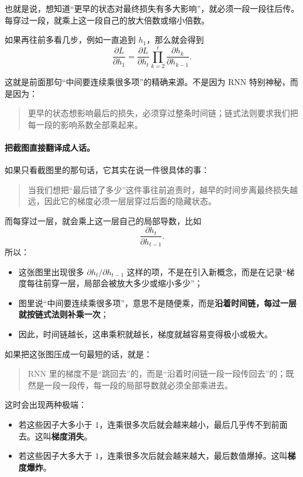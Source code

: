 \documentclass[12pt,a4paper]{ctexart}
\begin{document}
也就是说，想知道“更早的状态对最终损失有多大影响”，就必须一段一段往后传。每穿过一段，就乘上这一段自己的放大倍数或缩小倍数。

如果再往前多看几步，例如一直追到 \(h_1\)，那么就会得到
\[
\frac{\partial L}{\partial h_1}
=
\frac{\partial L}{\partial h_t}
\prod_{k=2}^{t}
\frac{\partial h_k}{\partial h_{k-1}}.
\]

这就是前面那句“中间要连续乘很多项”的精确来源。不是因为 RNN 特别神秘，而是因为：
\begin{quote}
更早的状态想影响最后的损失，必须穿过整条时间链；链式法则要求我们把每一段的影响系数全部乘起来。
\end{quote}

\paragraph{把截图直接翻译成人话。}
如果只看截图里的那句话，它其实在说一件很具体的事：
\begin{quote}
当我们想把“最后错了多少”这件事往前追责时，越早的时间步离最终损失越远，因此它的梯度必须一层层穿过后面的隐藏状态。
\end{quote}

而每穿过一层，就会乘上这一层自己的局部导数，比如
\[
\frac{\partial h_t}{\partial h_{t-1}}.
\]
所以：
\begin{itemize}
  \item 这张图里出现很多 \(\partial h_t / \partial h_{t-1}\) 这样的项，不是在引入新概念，而是在记录“梯度每往前穿一层，局部会被放大多少或缩小多少”；
  \item 图里说“中间要连续乘很多项”，意思不是随便乘，而是\textbf{沿着时间链，每过一层就按链式法则补乘一次}；
  \item 因此，时间链越长，这串乘积就越长，梯度就越容易变得极小或极大。
\end{itemize}

如果把这张图压成一句最短的话，就是：
\begin{quote}
RNN 里的梯度不是“跳回去”的，而是“沿着时间链一段一段传回去”的；既然是一段一段传，每一段的局部导数就必须全部乘进去。
\end{quote}

这时会出现两种极端：
\begin{itemize}
  \item 若这些因子大多小于 \(1\)，连乘很多次后就会越来越小，最后几乎传不到前面去。这叫\textbf{梯度消失}。
  \item 若这些因子大多大于 \(1\)，连乘很多次后就会越来越大，最后数值爆掉。这叫\textbf{梯度爆炸}。
\end{itemize}
\end{document}
